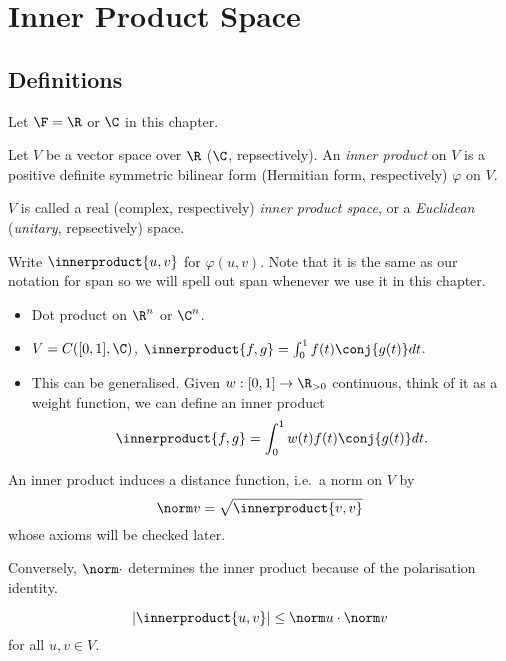 \documentclass[a4paper]{article}
\newcommand*{\ip}{\innerproduct}
\theoremstyle{definition}
\begin{document}
\section{Inner Product Space}

\subsection{Definitions}

Let \(\F = \R\) or \(\C\) in this chapter.

\begin{definition}
  Let \(V\) be a vector space over \(\R\) (\(\C\), repsectively). An \emph{inner product} on \(V\) is a positive definite symmetric bilinear form (Hermitian form, respectively) \(\varphi\) on \(V\).

  \(V\) is called a real (complex, respectively) \emph{inner product space}, or a \emph{Euclidean} (\emph{unitary}, repsectively) space.
\end{definition}

\begin{notation}
  Write \(\ip{u, v}\) for \(\varphi(u, v)\). Note that it is the same as our notation for span so we will spell out span whenever we use it in this chapter.
\end{notation}

\begin{eg}\leavevmode
  \begin{itemize}
  \item Dot product on \(\R^n\) or \(\C^n\).
  \item \(V = C([0, 1], \C)\), \(\ip{f, g} = \int_0^1 f(t) \conj{g(t)} dt\).
  \item This can be generalised. Given \(w: [0, 1] \to \R_{> 0}\) continuous, think of it as a weight function, we can define an inner product
    \[
      \ip{f, g} = \int_{0}^{1} w(t)f(t)\conj{g(t)} dt.
    \]
  \end{itemize}
\end{eg}

\begin{remark}
  An inner product induces a distance function, i.e.\ a norm on \(V\) by
  \[
    \norm v = \sqrt{\ip{v, v}}
  \]
  whose axioms will be checked later.
  
  Conversely, \(\norm \cdot\) determines the inner product because of the polarisation identity.
\end{remark}

\begin{lemma}
  \[
    |\ip{u, v}| \leq \norm u \cdot \norm v
  \]
  for all \(u, v \in V\).
\end{lemma}
\end{document}
